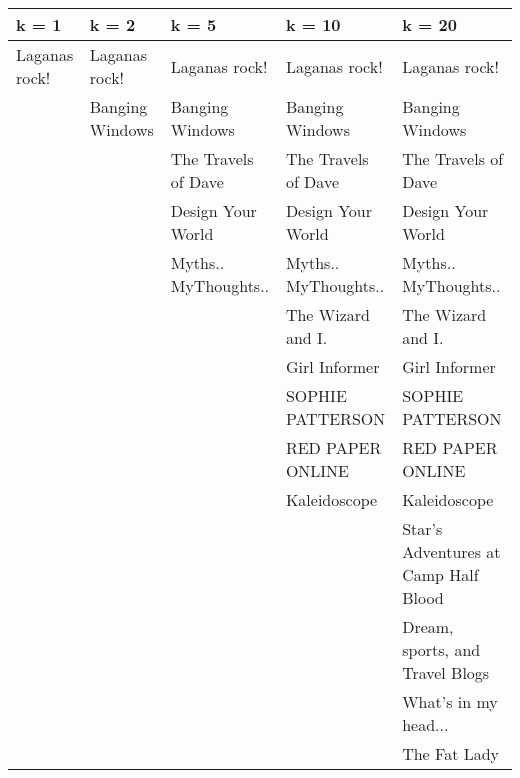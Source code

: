 \begin{tabular}{lllll}
\hline
 k = 1         & k = 2           & k = 5                & k = 10               & k = 20                                        \\
\hline
 Laganas rock! & Laganas rock!   & Laganas rock!        & Laganas rock!        & Laganas rock!                                 \\
               & Banging Windows & Banging Windows      & Banging Windows      & Banging Windows                               \\
               &                 & The Travels of Dave  & The Travels of Dave  & The Travels of Dave                           \\
               &                 & Design Your World    & Design Your World    & Design Your World                             \\
               &                 & Myths.. MyThoughts.. & Myths.. MyThoughts.. & Myths.. MyThoughts..                          \\
               &                 &                      & The Wizard and I.    & The Wizard and I.                             \\
               &                 &                      & Girl Informer        & Girl Informer                                 \\
               &                 &                      & SOPHIE PATTERSON     & SOPHIE PATTERSON                              \\
               &                 &                      & RED PAPER ONLINE     & RED PAPER ONLINE                              \\
               &                 &                      & Kaleidoscope         & Kaleidoscope                                  \\
               &                 &                      &                      & Star's Adventures at Camp Half Blood          \\
               &                 &                      &                      & Dream, sports, and Travel Blogs               \\
               &                 &                      &                      & What's in my head...                          \\
               &                 &                      &                      & The Fat Lady                                  \\

\end{tabular}
